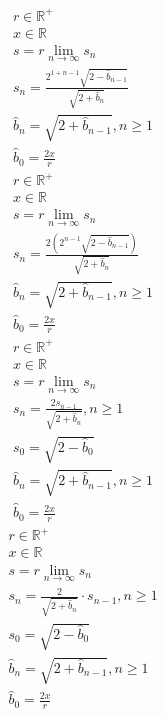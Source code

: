 \documentclass[a4paper,12pt]{report}
\begin{document}
\begin{subequations}
\begin{gather}
r \in \mathbb{R}^+ \\
x \in \mathbb{R} \\
s = r \lim \limits_{n \to \infty} s_n \\
s_n = \frac{2^{1+n-1} \sqrt{2 - \hat{b}_{n-1}}}{\sqrt{2 + \hat{b}_n}} \\
\hat{b}_n = \sqrt{2 + \hat{b}_{n-1}}, n \geq 1 \\
\hat{b}_0 = \frac{2x}{r}
\end{gather}
\end{subequations}
\begin{subequations}
\begin{gather}
r \in \mathbb{R}^+ \\
x \in \mathbb{R} \\
s = r \lim \limits_{n \to \infty} s_n \\
s_n = \frac{2 \left(2^{n-1} \sqrt{2 - \hat{b}_{n-1}}\right)}{\sqrt{2 + \hat{b}_n}} \\
\hat{b}_n = \sqrt{2 + \hat{b}_{n-1}}, n \geq 1 \\
\hat{b}_0 = \frac{2x}{r}
\end{gather}
\end{subequations}
\begin{subequations}
\begin{gather}
r \in \mathbb{R}^+ \\
x \in \mathbb{R} \\
s = r \lim \limits_{n \to \infty} s_n \\
s_n = \frac{2s_{n-1}}{\sqrt{2 + \hat{b}_n}}, n \geq 1 \\
s_0 = \sqrt{2 - \hat{b}_0} \\
\hat{b}_n = \sqrt{2 + \hat{b}_{n-1}}, n \geq 1 \\
\hat{b}_0 = \frac{2x}{r}
\end{gather}
\end{subequations}
\begin{subequations}
\begin{gather}
r \in \mathbb{R}^+ \\
x \in \mathbb{R} \\
s = r \lim \limits_{n \to \infty} s_n \\
s_n = \frac{2}{\sqrt{2 + \hat{b}_n}} \cdot s_{n-1}, n \geq 1 \\
s_0 = \sqrt{2 - \hat{b}_0} \\
\hat{b}_n = \sqrt{2 + \hat{b}_{n-1}}, n \geq 1 \\
\hat{b}_0 = \frac{2x}{r}
\end{gather}
\end{subequations}
\end{document}
